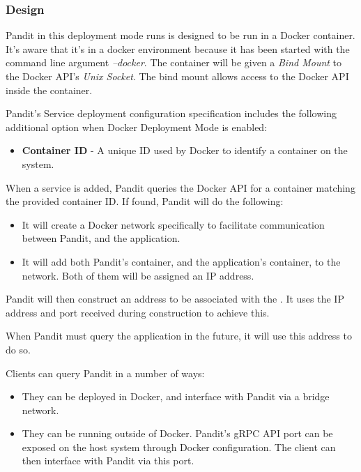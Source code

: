 \documentclass[a4paper,12pt]{report}
\begin{document}
\subsubsection{Design}
Pandit in this deployment mode runs is designed to be run in a Docker container. It's aware that it's in a docker environment because it has been started with the command line argument \textit{--docker}. The container will be given a \textit{Bind Mount} to the Docker API's \textit{Unix Socket}. The bind mount allows access to the Docker API inside the container.

Pandit's Service deployment configuration specification includes the following additional option when Docker Deployment Mode is enabled:
\begin{itemize}
    \item \textbf{Container ID} - A unique ID used by Docker to identify a container on the system.
\end{itemize}

When a service is added, Pandit queries the Docker API for a container matching the provided container ID. 
If found, Pandit will do the following:

\begin{itemize}
    \item It will create a Docker network specifically to facilitate communication between Pandit, and the application.
    \item It will add both Pandit's container, and the application's container, to the network. Both of them will be assigned an IP address.
\end{itemize}

Pandit will then construct an address to be associated with the \textit{}. It uses the IP address and port received during construction to achieve this.

When Pandit must query the application in the future, it will use this address to do so.

Clients can query Pandit in a number of ways:

\begin{itemize}
    \item They can be deployed in Docker, and interface with Pandit via a bridge network.
    \item They can be running outside of Docker. Pandit's gRPC API port can be exposed on the host system through Docker configuration. The client can then interface with Pandit via this port.
\end{itemize}
\end{document}
